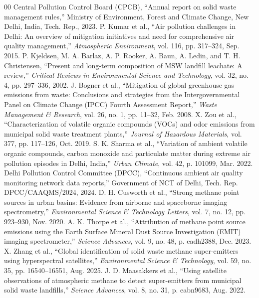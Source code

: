 \documentclass[conference]{IEEEtran}
\begin{document}

\begin{thebibliography}{00}
 Central Pollution Control Board (CPCB), ``Annual report on solid waste management rules,'' Ministry of Environment, Forest and Climate Change, New Delhi, India, Tech. Rep., 2023.
 P. Kumar et al., ``Air pollution challenges in Delhi: An overview of mitigation initiatives and need for comprehensive air quality management,'' \textit{Atmospheric Environment}, vol. 116, pp. 317--324, Sep. 2015.
 P. Kjeldsen, M. A. Barlaz, A. P. Rooker, A. Baun, A. Ledin, and T. H. Christensen, ``Present and long-term composition of MSW landfill leachate: A review,'' \textit{Critical Reviews in Environmental Science and Technology}, vol. 32, no. 4, pp. 297--336, 2002.
 J. Bogner et al., ``Mitigation of global greenhouse gas emissions from waste: Conclusions and strategies from the Intergovernmental Panel on Climate Change (IPCC) Fourth Assessment Report,'' \textit{Waste Management \& Research}, vol. 26, no. 1, pp. 11--32, Feb. 2008.
 X. Zou et al., ``Characterization of volatile organic compounds (VOCs) and odor emissions from municipal solid waste treatment plants,'' \textit{Journal of Hazardous Materials}, vol. 377, pp. 117--126, Oct. 2019.
 S. K. Sharma et al., ``Variation of ambient volatile organic compounds, carbon monoxide and particulate matter during extreme air pollution episodes in Delhi, India,'' \textit{Urban Climate}, vol. 42, p. 101099, Mar. 2022.
 Delhi Pollution Control Committee (DPCC), ``Continuous ambient air quality monitoring network data reports,'' Government of NCT of Delhi, Tech. Rep. DPCC/CAAQMS/2024, 2024.
 D. H. Cusworth et al., ``Strong methane point sources in urban basins: Evidence from airborne and spaceborne imaging spectrometry,'' \textit{Environmental Science \& Technology Letters}, vol. 7, no. 12, pp. 923--930, Nov. 2020.
 A. K. Thorpe et al., ``Attribution of methane point source emissions using the Earth Surface Mineral Dust Source Investigation (EMIT) imaging spectrometer,'' \textit{Science Advances}, vol. 9, no. 48, p. eadh2388, Dec. 2023.
 X. Zhang et al., ``Global identification of solid waste methane super-emitters using hyperspectral satellites,'' \textit{Environmental Science \& Technology}, vol. 59, no. 35, pp. 16540--16551, Aug. 2025.
 J. D. Maasakkers et al., ``Using satellite observations of atmospheric methane to detect super-emitters from municipal solid waste landfills,'' \textit{Science Advances}, vol. 8, no. 31, p. eabn9683, Aug. 2022.

\end{thebibliography}
\end{document}

